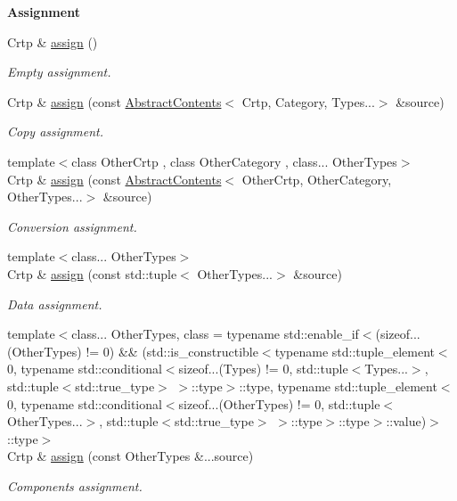 \begin{Indent}{\bf Assignment}\par
\begin{DoxyCompactItemize}
\item 
Crtp \& \hyperlink{classmagrathea_1_1AbstractContents_a726f3b7b4025af3b557b83bd5d31657d}{assign} ()
\begin{DoxyCompactList}\small\item\em Empty assignment. \end{DoxyCompactList}\item 
Crtp \& \hyperlink{classmagrathea_1_1AbstractContents_a9c115877006445149c5036627bb8fa67}{assign} (const \hyperlink{classmagrathea_1_1AbstractContents}{Abstract\-Contents}$<$ Crtp, Category, Types...$>$ \&source)
\begin{DoxyCompactList}\small\item\em Copy assignment. \end{DoxyCompactList}\item 
{\footnotesize template$<$class Other\-Crtp , class Other\-Category , class... Other\-Types$>$ }\\Crtp \& \hyperlink{classmagrathea_1_1AbstractContents_a1b7ae498d73dea568cf0a21ddff2d888}{assign} (const \hyperlink{classmagrathea_1_1AbstractContents}{Abstract\-Contents}$<$ Other\-Crtp, Other\-Category, Other\-Types...$>$ \&source)
\begin{DoxyCompactList}\small\item\em Conversion assignment. \end{DoxyCompactList}\item 
{\footnotesize template$<$class... Other\-Types$>$ }\\Crtp \& \hyperlink{classmagrathea_1_1AbstractContents_a100f454339d361f961746f29d13d2cc7}{assign} (const std\-::tuple$<$ Other\-Types...$>$ \&source)
\begin{DoxyCompactList}\small\item\em Data assignment. \end{DoxyCompactList}\item 
{\footnotesize template$<$class... Other\-Types, class  = typename std\-::enable\-\_\-if$<$(sizeof...(\-Other\-Types) != 0) \&\& (std\-::is\-\_\-constructible$<$typename std\-::tuple\-\_\-element$<$0, typename std\-::conditional$<$sizeof...(\-Types) != 0, std\-::tuple$<$\-Types...$>$, std\-::tuple$<$std\-::true\-\_\-type$>$ $>$\-::type$>$\-::type, typename std\-::tuple\-\_\-element$<$0, typename std\-::conditional$<$sizeof...(\-Other\-Types) != 0, std\-::tuple$<$\-Other\-Types...$>$, std\-::tuple$<$std\-::true\-\_\-type$>$ $>$\-::type$>$\-::type$>$\-::value)$>$\-::type$>$ }\\Crtp \& \hyperlink{classmagrathea_1_1AbstractContents_a2b504c799ad89c73e77ec182a73f0811}{assign} (const Other\-Types \&...source)
\begin{DoxyCompactList}\small\item\em Components assignment. \end{DoxyCompactList}\end{DoxyCompactItemize}
\end{Indent}
